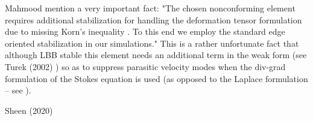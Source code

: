 Mahmood \etal \cite{maky17} mention a very important fact: "The chosen nonconforming element requires
additional stabilization for handling the deformation tensor formulation due to missing Korn's inequality 
\cite{horg95,knob00}.
To this end we employ the standard edge oriented stabilization \cite{tuos02,tuou07} in our simulations."
This is a rather unfortunate fact that although LBB stable this element needs an additional 
term in the weak form (see Turek \etal (2002) \cite{tuos02}) 
so as to suppress parasitic velocity modes when the div-grad formulation 
of the Stokes equation is used (as opposed to the Laplace formulation -- see \cite[Section 6.5.2]{dohu03}).

\Literature Sheen (2020) \cite{shee20}






